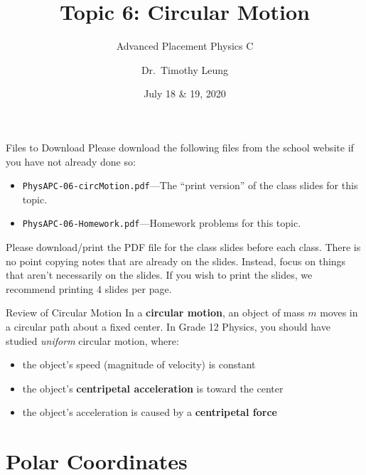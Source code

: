 \documentclass[12pt,compress,aspectratio=169]{beamer}
\title{Topic 6: Circular Motion}
\subtitle{Advanced Placement Physics C}
\author[TML]{Dr.\ Timothy Leung}
\institute{Olympiads School}
\date{July 18 \& 19, 2020}
\begin{document}
\begin{frame}
  \maketitle
\end{frame}


\begin{frame}{Files to Download}
  Please download the following files from the school website if you have not
  already done so:
  \begin{itemize}
  \item\texttt{PhysAPC-06-circMotion.pdf}---The ``print version'' of the
    class slides for this topic.
  \item\texttt{PhysAPC-06-Homework.pdf}---Homework problems for this topic.
  \end{itemize}
  \vspace{.1in}Please download/print the PDF file for the class slides before
  each class. There is no point copying notes that are already on the slides.
  Instead, focus on things that aren't necessarily on the slides. If you wish
  to print the slides, we recommend printing 4 slides per page.
\end{frame}



\begin{frame}{Review of Circular Motion}
  In a \textbf{circular motion}, an object of mass $m$ moves in a circular path
  about a fixed center. In Grade 12 Physics, you should have studied
  \emph{uniform} circular motion, where:
  \begin{itemize}
  \item the object's speed (magnitude of velocity) is constant
  \item the object's \textbf{centripetal acceleration} is toward the center
  \item the object's acceleration is caused by a \textbf{centripetal force}
  \end{itemize}
\end{frame}



\section{Polar Coordinates}
\end{document}

